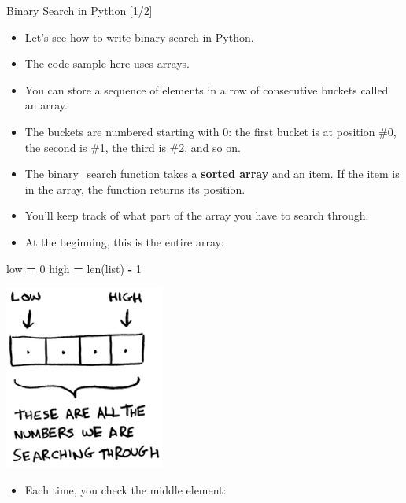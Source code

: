 \documentclass[ignorenonframetext,]{beamer}
\newenvironment{Shaded}{\begin{snugshade}}{\end{snugshade}}
\newcommand{\BuiltInTok}[1]{#1}
\newcommand{\DecValTok}[1]{\textcolor[rgb]{0.00,0.00,0.81}{#1}}
\newcommand{\NormalTok}[1]{#1}
\newcommand{\OperatorTok}[1]{\textcolor[rgb]{0.81,0.36,0.00}{\textbf{#1}}}
\providecommand{\tightlist}{%
  \setlength{\itemsep}{0pt}\setlength{\parskip}{0pt}}
\begin{document}
\begin{frame}[fragile]{Binary Search in Python {[}1/2{]}}
\protect\hypertarget{binary-search-in-python-12}{}

\begin{itemize}
\tightlist
\item
  Let's see how to write binary search in Python.
\item
  The code sample here uses arrays.
\item
  You can store a sequence of elements in a row of consecutive buckets
  called an array.
\item
  The buckets are numbered starting with 0: the first bucket is at
  position \#0, the second is \#1, the third is \#2, and so on.
\item
  The binary\_search function takes a \textbf{sorted array} and an item.
  If the item is in the array, the function returns its position.
\item
  You'll keep track of what part of the array you have to search
  through.
\item
  At the beginning, this is the entire array:
\end{itemize}

\begin{Shaded}
\begin{Highlighting}[]
\NormalTok{low }\OperatorTok{=} \DecValTok{0}
\NormalTok{high }\OperatorTok{=} \BuiltInTok{len}\NormalTok{(}\BuiltInTok{list}\NormalTok{) }\OperatorTok{-} \DecValTok{1}
\end{Highlighting}
\end{Shaded}

\includegraphics{./Chapter01-figure/array_binary_search_01.png}

\begin{itemize}
\tightlist
\item
  Each time, you check the middle element:
\end{itemize}


\end{frame}
\end{document}
